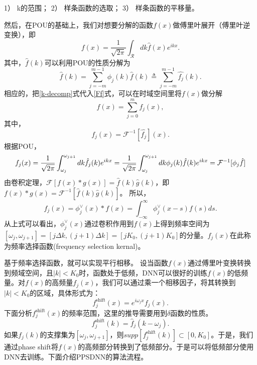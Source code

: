     1） k的范围；
    2） 样条函数的选取；
    3） 样条函数的平移量。


然后，在POU的基础上，我们对想要分解的函数$f(x)$做傅里叶展开（傅里叶逆变换），即
\begin{equation}
    f(x) = \frac{1}{\sqrt{2\pi}}\int_{\mathcal{R} }^{}dk\hat{f}(x)e^{ikx} . \label{Ff}
\end{equation}
其中，$\hat{f}(k)$可以利用POU的性质分解为
\begin{equation}
\widehat{f}(k)=
{\displaystyle\sum\limits_{j=-m}^{m-1}}
\phi_{j}(k)\widehat{f}(k)\triangleq
{\displaystyle\sum\limits_{j=-m}^{m-1}}
\widehat{f_{j}}(k). \label{k-decomp}
\end{equation}
相应的，把\ref{k-decomp}式代入\ref{Ff}式，可以在时域空间里将$f(x)$做分解
\begin{equation}
f(x)=
{\displaystyle\sum\limits_{j=0}^{m}}
f_{j}(x), \label{x-decomp}
\end{equation}
其中，
\[
f_{j}(x)=\mathcal{F}^{-1}[\widehat{f_{j}}](x).
\]
根据POU，
\begin{equation*}
    f_{j}(x) = \frac{1}{\sqrt{2\pi}}\int_{\omega _j }^{\omega_{j+1}}dk\hat{f_j}(k)e^{ikx}=\\
    \frac{1}{\sqrt{2\pi}}\int_{\omega _j }^{\omega_{j+1}}dk\phi_j(k)\hat{f}(k)e^{ikx}=\mathcal{F}^{-1}[\phi_j \hat{f}]
\end{equation*}
由卷积定理，$\mathcal{F}[f(x)*g(x)] = \hat{f}(k)\hat{g}(k)$，即$f(x)*g(x) = \mathcal{F}^{-1}[\hat{f}(k)\hat{g}(k)]$。
所以，
\begin{equation}
    f_j(x) = \phi_j^{\vee}(x)*f(x)=\int_{-\infty }^{\infty} \phi _j^{\vee}(x-s)f(s)ds .
\end{equation}
从上式可以看出，$\phi_j^{\vee}(x)$通过卷积作用到$f(x)$上得到频率空间为$[\omega_j,\omega_{j+1}]=[j\Delta k,(j+1)\Delta k]=[jK_0,(j+1)K_0]$的分量。$f_j(x)$在此称为频率选择函数(frequency selection kernal)。

基于频率选择函数，就可以实现平行相移。
设当函数$f(x)$通过傅里叶变换转换到频域空间，且$|k|<K_0$时，函数处于低频，DNN可以很好的训练$f(x)$的低频量。对$f(x)$的高频量$f_j(x)$，我们可以通过乘一个相移因子，将其转换到$|k|<K_0$的区域，具体形式为：
\begin{equation}
    f_j^{\text{shift}}(x) = e^{i\omega_jx}f_j(x) .
\end{equation}
下面分析$f_j^{\text{shift}}(x)$的频率范围，这里的推导需要用到$\delta$函数的性质。
\begin{equation}
    f_j^{\text{shift}}(k) = \hat{f}_j(k-\omega_j) .
\end{equation}
如果$f_j(k)$的支撑集为$[\omega_j,\omega_{j+1}]$，则$supp[f_j^{\text{shift}}(k)]\subset [0,K_0]$。于是，我们通过phase shift将$f(x)$的高频部分转换到了低频部分。于是可以将低频部分使用DNN去训练。下面介绍PPSDNN的算法流程。


